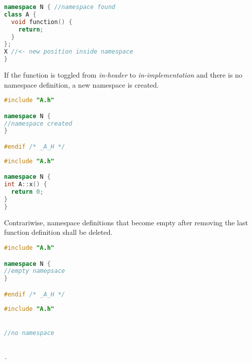 \begin{lstlisting}[caption={A.h},label={twofilesolution_impl},language=C++]
namespace N { //namespace found
class A {
  void function() {
    return;
  }
};
X //<- new position inside namespace
}
\end{lstlisting}

If the function is toggled from \textit{in-header} to \textit{in-implementation}
and there is no namespace definition, a new namespace is created.

\vspace{0.5cm}
\begin{minipage}{.48\textwidth}
\lstset{xrightmargin=0.5cm}
\begin{lstlisting}[caption={A.cpp, new namespace created},
label={addnamespace1}, language=C++]
#include "A.h"

namespace N {
//namespace created
}

#endif /* _A_H */
\end{lstlisting}
\end{minipage}%
\begin{minipage}{.48\textwidth}
\lstset{xleftmargin=0.5cm}
\begin{lstlisting}[caption={A.cpp,insterted function},
label={addnamespace2},language=C++]
#include "A.h"

namespace N {
int A::x() { 
  return 0;
}
}
\end{lstlisting}
\end{minipage}

Contrariwise, namespace definitions that become empty after removing the 
last function definition shall be deleted.

\vspace{0.5cm}
\begin{minipage}{.48\textwidth}
\lstset{xrightmargin=0.5cm}
\begin{lstlisting}[caption={A.cpp, empty namespace},
label={delnamespace1}, language=C++]
#include "A.h"

namespace N {
//empty namepsace
}

#endif /* _A_H */
\end{lstlisting}
\end{minipage}%
\begin{minipage}{.48\textwidth}
\lstset{xleftmargin=0.5cm}
\begin{lstlisting}[caption={A.cpp, removed empty namepsace},
label={delnamespace2},language=C++]
#include "A.h"


//no namespace


.
\end{lstlisting}
\end{minipage}


